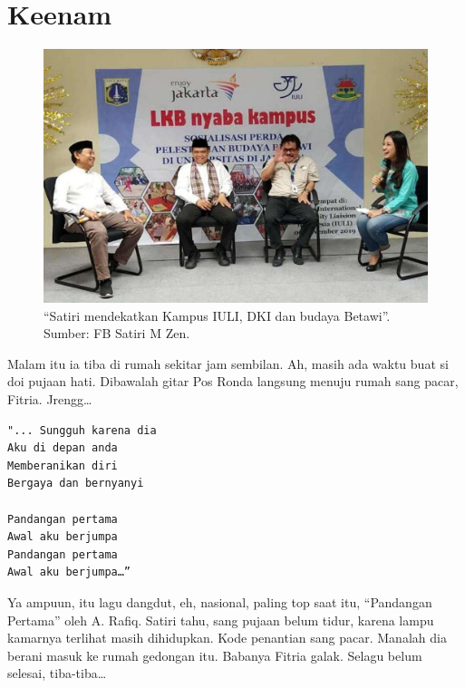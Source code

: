 
\chapter{Keenam}

\begin{figure}[htbp]
\centerline{\includegraphics[scale=1.0]{01-06-01}}
\caption{“Satiri mendekatkan Kampus IULI, DKI dan budaya Betawi”. Sumber: FB Satiri M Zen.}
\label{01-06-01}
\end{figure}
%

Malam itu ia tiba di rumah sekitar jam sembilan. Ah, masih ada waktu buat si doi pujaan hati. Dibawalah gitar Pos Ronda langsung menuju rumah sang pacar, Fitria. Jrengg…

\begin{verbatim}
"... Sungguh karena dia
Aku di depan anda
Memberanikan diri
Bergaya dan bernyanyi

Pandangan pertama
Awal aku berjumpa
Pandangan pertama
Awal aku berjumpa…”
\end{verbatim}

Ya ampuun, itu lagu dangdut, eh, nasional, paling top saat itu, “Pandangan Pertama” oleh A. Rafiq. Satiri tahu, sang pujaan belum tidur, karena lampu kamarnya terlihat masih dihidupkan. Kode penantian sang pacar. Manalah dia berani masuk ke rumah gedongan itu. Babanya Fitria galak. Selagu belum selesai, tiba-tiba…

